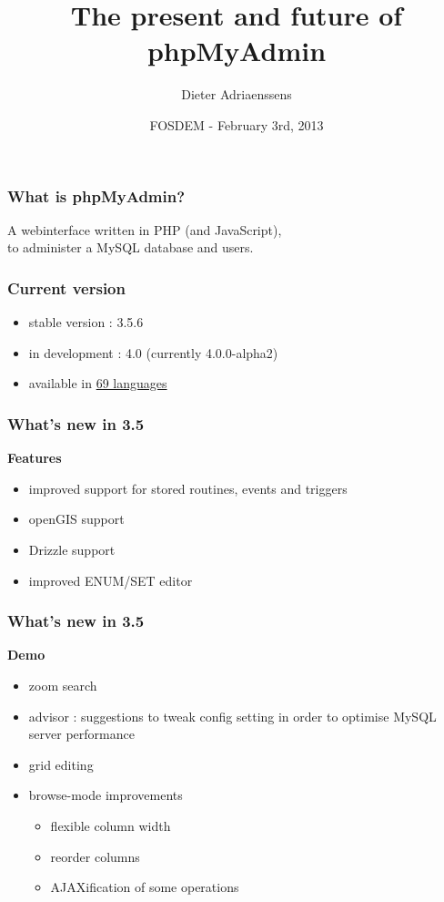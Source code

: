 \documentclass[14pt]{beamer}
\title{The present and future of phpMyAdmin}
\author{Dieter Adriaenssens}
\institute[phpMyAdmin]{phpMyAdmin developer}
\date[FOSDEM - 3Feb2013]{FOSDEM - February 3rd, 2013}
\begin{document}
  \begin{frame}
  \titlepage
  \end{frame}
  \begin{frame}
    \frametitle{What is phpMyAdmin?}
      A webinterface written in PHP (and JavaScript),\\
      to administer a MySQL database and users.
  \end{frame}
  \begin{frame}
    \frametitle{Current version}
    \begin{itemize}[<+->]
      \item stable version : 3.5.6
      \item in development : 4.0 (currently 4.0.0-alpha2)
      \item available in \href{http://www.phpmyadmin.net/home_page/translations.php}{69 languages}
    \end{itemize}
  \end{frame}
  \begin{frame}
    \frametitle{What's new in 3.5}
   \textbf{{\color{PmaOlive}Features}}
    \pause
    \begin{itemize}[<+->]
      \item improved support for stored routines, events and triggers
      \item openGIS support
      \item Drizzle support
      \item improved ENUM/SET editor
    \end{itemize}
  \end{frame}
  \begin{frame}
    \frametitle{What's new in 3.5}
    \textbf{{\color{PmaOlive}Demo}}
    \begin{itemize}
      \item zoom search
      \item advisor : suggestions to tweak config setting in order to optimise MySQL server performance
      \item grid editing
      \item browse-mode improvements
      \begin{itemize}
        \item flexible column width
        \item reorder columns
        \item AJAXification of some operations
      \end{itemize}
    \end{itemize}
  \end{frame}
\end{document}
